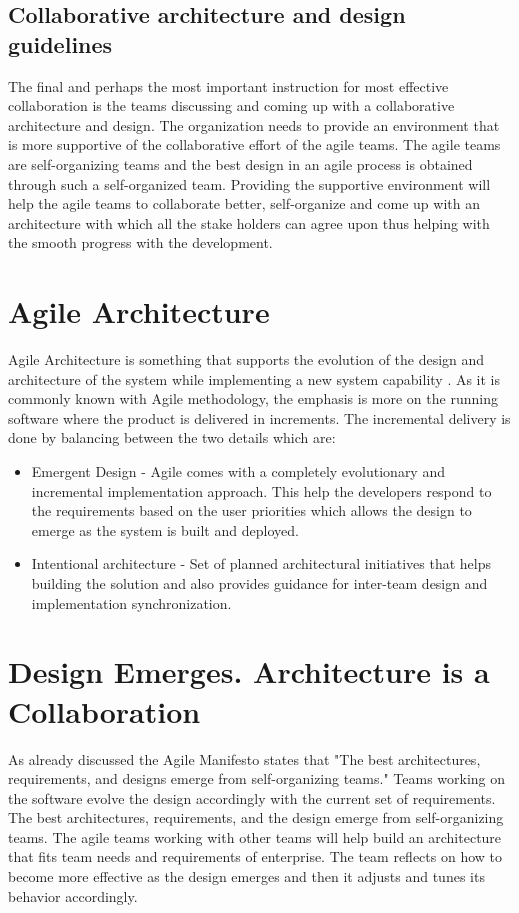 \documentclass[sigconf]{acmart}
\begin{document}
\subsection {Collaborative architecture and design guidelines}
The final and perhaps the most important instruction for most effective collaboration is the teams discussing and coming up with a collaborative architecture and design. The organization needs to provide an environment that is more supportive of the collaborative effort of the agile teams. The agile teams are self-organizing teams and the best design in an agile process is obtained through such a self-organized team. Providing the supportive environment will help the agile teams to collaborate better, self-organize and come up with an architecture with which all the stake holders can agree upon thus helping with the smooth progress with the development.

\section{Agile Architecture}
Agile Architecture is something that supports the evolution of the design and architecture of the system while implementing a new system capability \cite{Saf01}. As it is commonly known with Agile methodology, the emphasis is more on the running software where the product is delivered in increments. The incremental delivery is done by balancing between the two details which are:

\begin{itemize}
  \item Emergent Design - Agile comes with a completely evolutionary and incremental implementation approach. This help the developers respond to the requirements based on the user priorities which allows the design to emerge as the system is built and deployed. 

  \item Intentional architecture - Set of planned architectural initiatives that helps building the solution and also provides guidance for inter-team design and implementation synchronization.
\end{itemize}

\section{Design Emerges. Architecture is a Collaboration}
As already discussed the Agile Manifesto states that "The best architectures, requirements, and designs emerge from self-organizing teams." Teams working on the software evolve the design accordingly with the current set of requirements. The best architectures, requirements, and the design emerge from self-organizing teams. The agile teams working with other teams will help build an architecture that fits team needs and requirements of enterprise. The team reflects on how to become more effective as the design emerges and then it adjusts and tunes its behavior accordingly.
\end{document}
